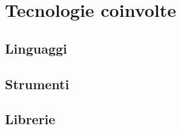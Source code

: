 \section{Tecnologie coinvolte}
\subsection{Linguaggi}

\subsection{Strumenti}

\subsection{Librerie}